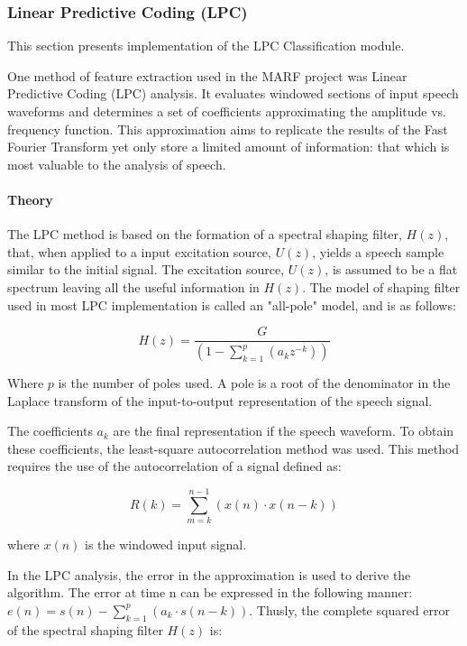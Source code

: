 \subsubsection{Linear Predictive Coding (LPC)}\label{sect:lpc}

This section presents implementation of the LPC Classification module.

One method of feature extraction used in the MARF project was Linear
Predictive Coding (LPC) analysis. It evaluates windowed sections of
input speech waveforms and determines a set of coefficients
approximating the amplitude vs. frequency function. This approximation
aims to replicate the results of the Fast Fourier Transform yet only
store a limited amount of information: that which is most valuable to
the analysis of speech.

\paragraph{Theory}

The LPC method is based on the formation of a spectral shaping filter,
$H(z)$, that, when applied to a input excitation source, $U(z)$, yields a
speech sample similar to the initial signal. The excitation source,
$U(z)$, is assumed to be a flat spectrum leaving all the useful
information in $H(z)$. The model of shaping filter used in most LPC
implementation is called an "all-pole" model, and is as follows:

$$ H(z) = \frac{G}{\left(1 - \displaystyle\sum_{k=1}^{p}(a_{k} z^{-k})\right)} $$

Where $p$ is the number of poles used. A pole is a root of the
denominator in the Laplace transform of the input-to-output
representation of the speech signal.

The coefficients $a_{k}$ are the final representation if the speech
waveform. To obtain these coefficients, the least-square
autocorrelation method was used. This method requires the use of the
autocorrelation of a signal defined as:

$$ R(k) = \displaystyle\sum_{m=k}^{n-1}(x(n) \cdot x(n-k)) $$

where $x(n)$ is the windowed input signal.

In the LPC analysis, the error in the approximation is used to derive
the algorithm. The error at time n can be expressed in the following
manner: $ e(n) = s(n) - \displaystyle\sum_{k=1}^{p}\left(a_{k} \cdot s(n-k)\right) $. Thusly,
the complete squared error of the spectral shaping filter $H(z)$ is:


